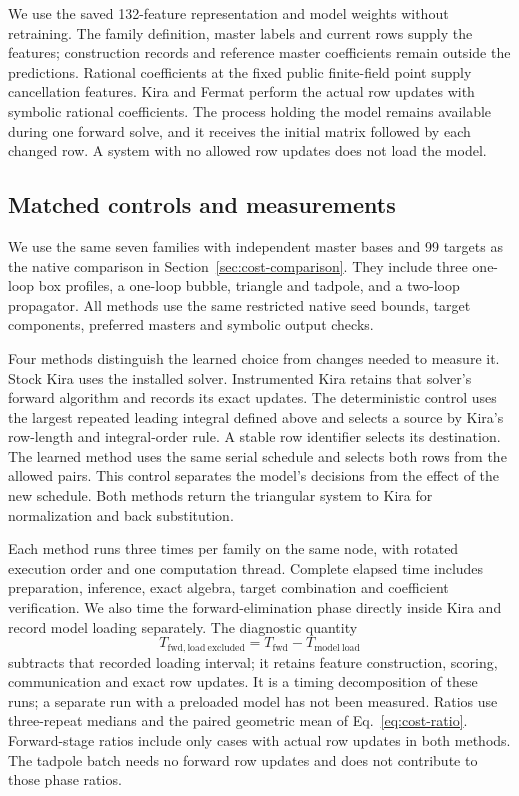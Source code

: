 We use the saved 132-feature representation and model weights without
retraining. The family definition, master labels and current rows supply
the features; construction records and reference master coefficients
remain outside the predictions. Rational coefficients at the fixed
public finite-field point supply cancellation features. Kira and Fermat
perform the actual row updates with symbolic rational coefficients.
The process holding the model remains available during one forward
solve, and it receives the initial matrix followed by each changed row.
A system with no allowed row updates does not load the model.

\subsection{Matched controls and measurements}
We use the same seven families with independent master bases and 99 targets as the
native comparison in Section~\ref{sec:cost-comparison}. They include three
one-loop box profiles, a one-loop bubble, triangle and tadpole, and a
two-loop propagator. All methods use the same restricted native seed
bounds, target components, preferred masters and symbolic output checks.

Four methods distinguish the learned choice from changes needed to
measure it. Stock Kira uses the installed solver. Instrumented Kira
retains that solver's forward algorithm and records its exact updates.
The deterministic control uses the largest repeated leading integral
defined above and selects a source by Kira's row-length and integral-order
rule. A stable row identifier selects its destination. The learned
method uses the same serial schedule and selects both rows from the
allowed pairs. This control separates the model's decisions from the
effect of the new schedule. Both methods return the triangular system
to Kira for normalization and back substitution.

Each method runs three times per family on the same node, with rotated
execution order and one computation thread. Complete elapsed time
includes preparation, inference, exact algebra, target combination and
coefficient verification. We also time the forward-elimination phase
directly inside Kira and record model loading separately. The diagnostic
quantity
\begin{equation}
 T_{\mathrm{fwd,load\ excluded}}
 =T_{\mathrm{fwd}}-T_{\mathrm{model\ load}}
\end{equation}
subtracts that recorded loading interval; it retains feature construction,
scoring, communication and exact row updates. It is a timing
decomposition of these runs; a separate run with a preloaded model
has not been measured. Ratios use three-repeat medians and the
paired geometric mean of Eq.~\eqref{eq:cost-ratio}. Forward-stage ratios
include only cases with actual row updates in both methods.
The tadpole batch needs no forward row updates and does not contribute
to those phase ratios.


